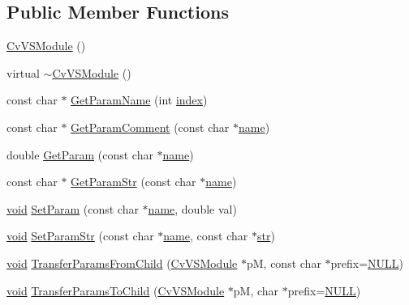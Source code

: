 \subsection*{Public Member Functions}
\begin{DoxyCompactItemize}
\item 
\hyperlink{classCvVSModule_a88f0590dcb1de5445900720d63cd6a7f}{Cv\-V\-S\-Module} ()
\item 
virtual \hyperlink{classCvVSModule_a9d31398df5a4438513ccf832a478e77a}{$\sim$\-Cv\-V\-S\-Module} ()
\item 
const char $\ast$ \hyperlink{classCvVSModule_a77191dbaaee4762699f58bf640a1172e}{Get\-Param\-Name} (int \hyperlink{core__c_8h_a750b5d744c39a06bfb13e6eb010e35d0}{index})
\item 
const char $\ast$ \hyperlink{classCvVSModule_a4cde5c64e09263fb4f6e6837062e644c}{Get\-Param\-Comment} (const char $\ast$\hyperlink{core__c_8h_add928d8eb85ea33a25a67db3406d4887}{name})
\item 
double \hyperlink{classCvVSModule_a32b0d2c05a86470bc74bbb905dd9549f}{Get\-Param} (const char $\ast$\hyperlink{core__c_8h_add928d8eb85ea33a25a67db3406d4887}{name})
\item 
const char $\ast$ \hyperlink{classCvVSModule_ac537ab02459c7d2598e3bbeacf9f89d2}{Get\-Param\-Str} (const char $\ast$\hyperlink{core__c_8h_add928d8eb85ea33a25a67db3406d4887}{name})
\item 
\hyperlink{legacy_8hpp_a8bb47f092d473522721002c86c13b94e}{void} \hyperlink{classCvVSModule_a07b733641608273c0f58f856dba5fe09}{Set\-Param} (const char $\ast$\hyperlink{core__c_8h_add928d8eb85ea33a25a67db3406d4887}{name}, double val)
\item 
\hyperlink{legacy_8hpp_a8bb47f092d473522721002c86c13b94e}{void} \hyperlink{classCvVSModule_ad27446e3c04458895524d4c58172b288}{Set\-Param\-Str} (const char $\ast$\hyperlink{core__c_8h_add928d8eb85ea33a25a67db3406d4887}{name}, const char $\ast$\hyperlink{core__c_8h_a5f3a65d240411b0018990ff992b348c0}{str})
\item 
\hyperlink{legacy_8hpp_a8bb47f092d473522721002c86c13b94e}{void} \hyperlink{classCvVSModule_a241881c14ea04a9b6074035dd20f8b3f}{Transfer\-Params\-From\-Child} (\hyperlink{classCvVSModule}{Cv\-V\-S\-Module} $\ast$p\-M, const char $\ast$prefix=\hyperlink{Config_8cpp_a070d2ce7b6bb7e5c05602aa8c308d0c4}{N\-U\-L\-L})
\item 
\hyperlink{legacy_8hpp_a8bb47f092d473522721002c86c13b94e}{void} \hyperlink{classCvVSModule_a32b8440de94ed66902f47be6cc309d19}{Transfer\-Params\-To\-Child} (\hyperlink{classCvVSModule}{Cv\-V\-S\-Module} $\ast$p\-M, char $\ast$prefix=\hyperlink{Config_8cpp_a070d2ce7b6bb7e5c05602aa8c308d0c4}{N\-U\-L\-L})

\end{DoxyCompactItemize}
